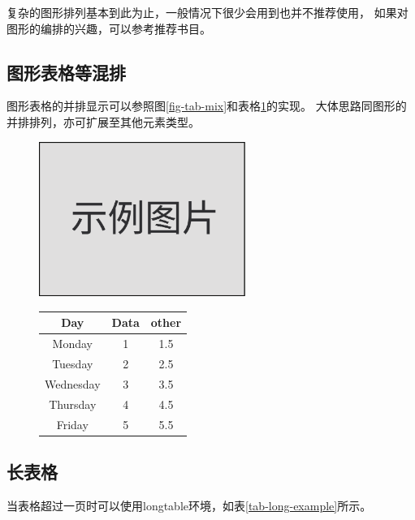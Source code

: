 				复杂的图形排列基本到此为止，一般情况下很少会用到也并不推荐使用，
				如果对图形的编排的兴趣，可以参考推荐书目。
				
				\subsection{图形表格等混排}
				\label{subsec-morefigtab}
				图形表格的并排显示可以参照图\ref{fig-tab-mix}和表格\ref{tab-fig-mix}的实现。
				大体思路同图形的并排排列，亦可扩展至其他元素类型。
				\begin{figure}[h!]
					\begin{minipage}{0.5\textwidth}
						\centering
						\includegraphics[width=0.6\textwidth]{figure/image.pdf}
						\label{fig-tab-mix}
					\end{minipage}
					\begin{minipage}{0.5\textwidth}
						\centering
						\begin{tabular}{c||c|c} \hline
							Day       & Data & other \\ \hline \hline
							Monday    & 1    & 1.5   \\
							Tuesday   & 2    & 2.5   \\
							Wednesday & 3    & 3.5   \\
							Thursday  & 4    & 4.5   \\
							Friday    & 5    & 5.5   \\ \hline
						\end{tabular}
						\label{tab-fig-mix}
					\end{minipage}
				\end{figure}
				
				\subsection{长表格}
				\label{subsec-longtab}
				当表格超过一页时可以使用longtable环境，如表\ref{tab-long-example}所示。
				
